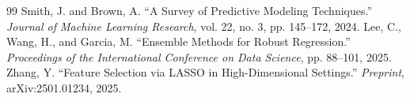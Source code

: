 \begin{thebibliography}{99}
   Smith, J. and Brown, A. ``A Survey of Predictive Modeling Techniques.'' \emph{Journal of Machine Learning Research}, vol. 22, no. 3, pp. 145--172, 2024.
   Lee, C., Wang, H., and Garcia, M. ``Ensemble Methods for Robust Regression.'' \emph{Proceedings of the International Conference on Data Science}, pp. 88--101, 2025.
   Zhang, Y. ``Feature Selection via LASSO in High-Dimensional Settings.'' \emph{Preprint}, arXiv:2501.01234, 2025.
\end{thebibliography}
